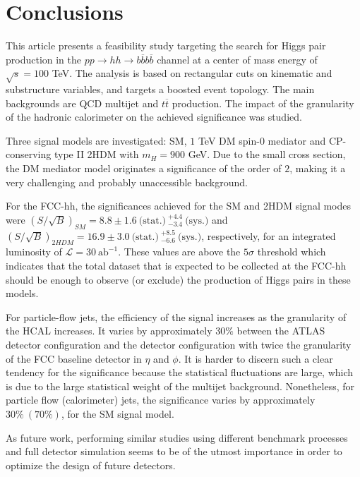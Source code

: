 
\section{Conclusions}
\label{sec:concl}

This article presents a feasibility study targeting the search for Higgs pair production in the $pp\rightarrow hh\rightarrow b\overline{b}b\overline{b}$ channel at a center of mass energy of $\sqrt{s}=100$ TeV. The analysis is based on rectangular cuts on kinematic and substructure variables, and targets a boosted event topology. The main backgrounds are QCD multijet and $t\overline{t}$ production. The impact of the granularity of the hadronic calorimeter on the achieved significance was studied. 

Three signal models are investigated: SM, $1$ TeV DM spin-$0$ mediator and CP-conserving type II 2HDM with $m_H=900$ GeV. Due to the small cross section, the DM mediator model originates a significance of the order of $2$, making it a very challenging and probably unaccessible background. 

For the FCC-hh, the significances achieved for the SM and 2HDM signal modes were $(S/\sqrt{B})_{SM}=8.8\pm 1.6~\text{(stat.)}~^{+4.4}_{-3.4}~\text{(sys.)}$ and $(S/\sqrt{B})_{2HDM}=16.9\pm 3.0~\text{(stat.)}~^{+8.5}_{-6.6}~\text{(sys.)}$, respectively, for an integrated luminosity of $\mathcal{L}=30~\text{ab}^{-1}$. These values are above the $5\sigma$ threshold which indicates that the total dataset that is expected to be collected at the FCC-hh should be enough to observe (or exclude) the production of Higgs pairs in these models.

For particle-flow jets, the efficiency of the signal increases as the granularity of the HCAL increases. It varies by approximately $30\%$ between the ATLAS detector configuration and the detector configuration with twice the granularity of the FCC baseline detector in $\eta$ and $\phi$. It is harder to discern such a clear tendency for the significance because the statistical fluctuations are large, which is due to the large statistical weight of the multijet background. Nonetheless, for particle flow (calorimeter) jets, the significance varies by approximately $30\%~(70\%)$, for the SM signal model. 

As future work, performing similar studies using different benchmark processes and full detector simulation seems to be of the utmost importance in order to optimize the design of future detectors.

